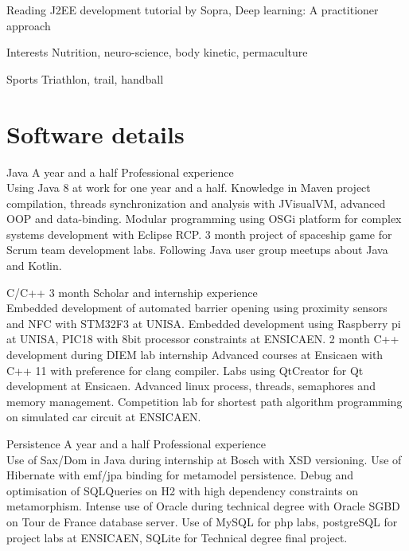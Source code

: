 \documentclass{tccv-master/tccv}
\begin{document}
\begin{factlist}

\item{Reading}
	{J2EE development tutorial by Sopra, Deep learning: A practitioner approach}
\item{Interests}
	{Nutrition, neuro-science, body kinetic, permaculture}
\item{Sports}
	{Triathlon, trail, handball}
\end{factlist}
\newpage




\section{Software details}

\begin{eventlist}

\item
{Java}
{A year and a half}
{Professional experience}\\
Using Java 8 at work for one year and a half.
Knowledge in Maven project compilation, threads synchronization and analysis with JVisualVM, advanced OOP and data-binding.
Modular programming using OSGi platform for complex systems development with Eclipse RCP.
3 month project of spaceship game for Scrum team development labs.
Following Java user group meetups about Java and Kotlin. 

\item
{C/C++}
{3 month}
{Scholar and internship experience}\\
Embedded development of automated barrier opening using proximity sensors and NFC with STM32F3 at UNISA.
Embedded development using Raspberry pi at UNISA, PIC18 with 8bit processor constraints at ENSICAEN.
2 month C++ development during DIEM lab internship 
Advanced courses at Ensicaen with C++ 11 with preference for clang compiler.
Labs using QtCreator for Qt development at Ensicaen.
Advanced linux process, threads, semaphores and memory management.
Competition lab for shortest path algorithm programming on simulated car circuit at ENSICAEN.


\item
{Persistence}
{A year and a half}
{Professional experience}\\
Use of Sax/Dom in Java during internship at Bosch with XSD versioning.
Use of Hibernate with emf/jpa binding for metamodel persistence. 
Debug and optimisation of SQLQueries on H2 with high dependency constraints on metamorphism.
Intense use of Oracle during technical degree with Oracle SGBD on Tour de France database server.
Use of MySQL for php labs, postgreSQL for project labs at ENSICAEN, SQLite for Technical degree final project.


\end{eventlist}
\end{document}
